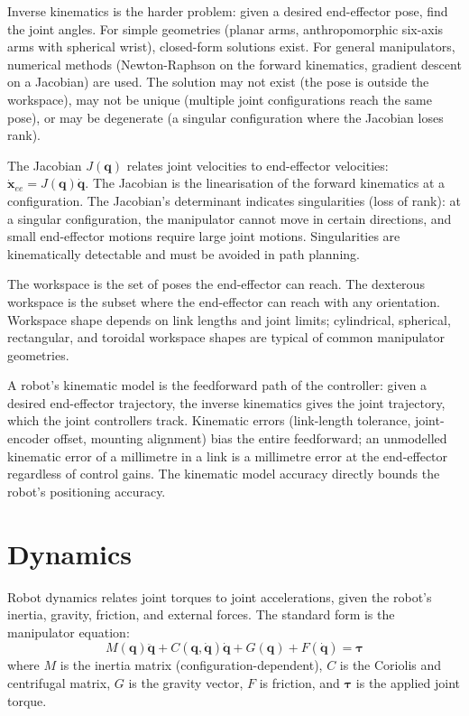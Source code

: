 Inverse kinematics is the harder problem: given a desired end-effector pose, find the joint angles. For simple geometries (planar arms, anthropomorphic six-axis arms with spherical wrist), closed-form solutions exist. For general manipulators, numerical methods (Newton-Raphson on the forward kinematics, gradient descent on a Jacobian) are used. The solution may not exist (the pose is outside the workspace), may not be unique (multiple joint configurations reach the same pose), or may be degenerate (a singular configuration where the Jacobian loses rank).

The Jacobian $J(\mathbf{q})$ relates joint velocities to end-effector velocities: $\dot{\mathbf{x}}_{ee} = J(\mathbf{q}) \dot{\mathbf{q}}$. The Jacobian is the linearisation of the forward kinematics at a configuration. The Jacobian's determinant indicates singularities (loss of rank): at a singular configuration, the manipulator cannot move in certain directions, and small end-effector motions require large joint motions. Singularities are kinematically detectable and must be avoided in path planning.

The workspace is the set of poses the end-effector can reach. The dexterous workspace is the subset where the end-effector can reach with any orientation. Workspace shape depends on link lengths and joint limits; cylindrical, spherical, rectangular, and toroidal workspace shapes are typical of common manipulator geometries.

\begin{archetype}
A robot's kinematic model is the feedforward path of the controller: given a desired end-effector trajectory, the inverse kinematics gives the joint trajectory, which the joint controllers track. Kinematic errors (link-length tolerance, joint-encoder offset, mounting alignment) bias the entire feedforward; an unmodelled kinematic error of a millimetre in a link is a millimetre error at the end-effector regardless of control gains. The kinematic model accuracy directly bounds the robot's positioning accuracy.
\end{archetype}

\section{Dynamics}

Robot dynamics relates joint torques to joint accelerations, given the robot's inertia, gravity, friction, and external forces. The standard form is the manipulator equation:
$$M(\mathbf{q}) \ddot{\mathbf{q}} + C(\mathbf{q}, \dot{\mathbf{q}}) \dot{\mathbf{q}} + G(\mathbf{q}) + F(\dot{\mathbf{q}}) = \boldsymbol{\tau}$$
where $M$ is the inertia matrix (configuration-dependent), $C$ is the Coriolis and centrifugal matrix, $G$ is the gravity vector, $F$ is friction, and $\boldsymbol{\tau}$ is the applied joint torque.

